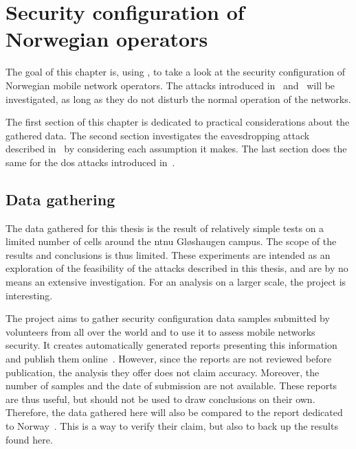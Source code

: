 \chapter{Security configuration of Norwegian operators}
\label{chap:security_configuration_of_norwegian_operators}

\iffalse

    Dev these
    attacks, test if it works! Insist on the product, no other
    publication gives this level of detail in the security of norwegian
    network. A bit in decoding gsm but almost nothing. try to explain
    the method and give it a nice name. about the method, talk about
    gsmmap and maybe analyze their method. how i tried to solve the pb
    and gather the data.

\fi
  The goal of this chapter is, using , to take a look at
  the security configuration of Norwegian mobile network operators. The
  attacks introduced in~
  and~ will be investigated, as long as they do
  not disturb the normal operation of the networks.

  The first section of this chapter is dedicated to practical
  considerations about the gathered data. The second section
  investigates the eavesdropping attack described
  in~ by considering each assumption
  it makes. The last section does the same for the \gls{dos} attacks
  introduced in~.

  \section{Data gathering}

    The data gathered for this thesis is the result of relatively simple
    tests on a limited number of cells around the \gls{ntnu} Gløshaugen
    campus. The scope of the results and conclusions is thus limited.
    These experiments are intended as an exploration of the feasibility
    of the attacks described in this thesis, and are by no means an
    extensive investigation. For an analysis on a larger scale, the
     project is interesting.

    The  project  aims to gather security configuration
    data samples submitted by volunteers from all over the world and to
    use it to assess mobile networks security. It creates automatically
    generated reports presenting this information and publish them
    online~\cite{security_research_labs_gsm_????}. However, since the
    reports are not reviewed before publication, the analysis they offer
    does not claim accuracy. Moreover, the number of samples and the
    date of submission are not available. These reports are thus useful,
    but should not be used to draw conclusions on their own. Therefore,
    the data gathered here will also be compared to the 
    report dedicated to
    Norway~\cite{security_research_labs_mobile_2015}. This is a way to
    verify their claim, but also to back up the results found here.

